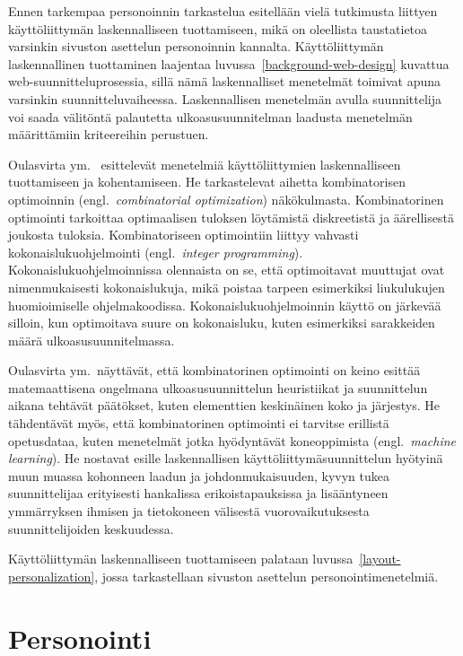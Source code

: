 \documentclass[finnish, 12pt, a4paper, elec, utf8, a-1b, online]{aaltothesis}
\begin{document}
Ennen tarkempaa personoinnin tarkastelua esitellään vielä tutkimusta liittyen
käyttöliittymän laskennalliseen tuottamiseen, mikä on oleellista taustatietoa
varsinkin sivuston asettelun personoinnin kannalta. Käyttöliittymän
laskennallinen tuottaminen laajentaa luvussa~\ref{background-web-design}
kuvattua web-suunnitteluprosessia, sillä nämä laskennalliset menetelmät toimivat
apuna varsinkin suunnitteluvaiheessa. Laskennallisen menetelmän avulla
suunnittelija voi saada välitöntä palautetta ulkoasusuunnitelman laadusta
menetelmän määrittämiin kriteereihin perustuen.

Oulasvirta ym.~\cite{9000519} esittelevät menetelmiä käyttöliittymien
laskennalliseen tuottamiseen ja kohentamiseen. He tarkastelevat aihetta
kombinatorisen optimoinnin (engl.~\textit{combinatorial optimization})
näkökulmasta. Kombinatorinen optimointi tarkoittaa optimaalisen tuloksen
löytämistä diskreetistä ja äärellisestä joukosta tuloksia. Kombinatoriseen
optimointiin liittyy vahvasti kokonaislukuohjelmointi (engl.~\textit{integer
programming}). Kokonaislukuohjelmoinnissa olennaista on se, että optimoitavat
muuttujat ovat nimenmukaisesti kokonaislukuja, mikä poistaa tarpeen esimerkiksi
liukulukujen huomioimiselle ohjelmakoodissa. Kokonaislukuohjelmoinnin käyttö on
järkevää silloin, kun optimoitava suure on kokonaisluku, kuten esimerkiksi
sarakkeiden määrä ulkoasusuunnitelmassa.

Oulasvirta ym.~näyttävät, että kombinatorinen optimointi on keino esittää
matemaattisena ongelmana ulkoasusuunnittelun heuristiikat ja suunnittelun aikana
tehtävät päätökset, kuten elementtien keskinäinen koko ja järjestys. He
tähdentävät myös, että kombinatorinen optimointi ei tarvitse erillistä
opetusdataa, kuten menetelmät jotka hyödyntävät koneoppimista
(engl.~\textit{machine learning}). He nostavat esille laskennallisen
käyttöliittymäsuunnittelun hyötyinä muun muassa kohonneen laadun ja
johdonmukaisuuden, kyvyn tukea suunnittelijaa erityisesti hankalissa
erikoistapauksissa ja lisääntyneen ymmärryksen ihmisen ja tietokoneen välisestä
vuorovaikutuksesta suunnittelijoiden keskuudessa.

Käyttöliittymän laskennalliseen tuottamiseen palataan
luvussa~\ref{layout-personalization}, jossa tarkastellaan sivuston asettelun
personointimenetelmiä.

\clearpage
\section{Personointi}\label{personalization}
\end{document}
